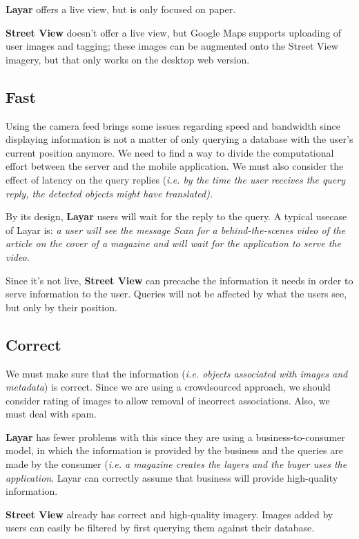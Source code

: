 \documentclass[a4paper,onecolumn,oneside,titlepage,11pt]{article}
\begin{document}
\textbf{Layar} offers a live view, but is only focused on paper.

\textbf{Street View} doesn't offer a live view, but Google Maps supports uploading of user images and tagging; these images can be augmented onto the Street View imagery, but that only works on the desktop web version.
\subsection*{Fast}
Using the camera feed brings some issues regarding speed and bandwidth since displaying information is not a matter of only querying a database with the user's current position anymore. We need to find a way to divide the computational effort between the server and the mobile application. We must also consider the effect of latency on the query replies (\emph{i.e. by the time the user receives the query reply, the detected objects might have translated).}

By its design, \textbf{Layar} users will wait for the reply to the query. A typical usecase of Layar is: \emph{a user will see the message \emph{Scan for a behind-the-scenes video of the article} on the cover of a magazine and will wait for the application to serve the video}.

Since it's not live, \textbf{Street View} can precache the information it needs in order to serve information to the user. Queries will not be affected by what the users see, but only by their position.

\subsection*{Correct}
We must make sure that the information (\emph{i.e. objects associated with images and metadata}) is correct. Since we are using a crowdsourced approach, we should consider rating of images to allow removal of incorrect associations. Also, we must deal with spam.

\textbf{Layar} has fewer problems with this since they are using a business-to-consumer model, in which the information is provided by the business and the queries are made by the consumer (\emph{i.e. a magazine creates the layers and the buyer uses the application}. Layar can correctly assume that business will provide high-quality information.

\textbf{Street View} already has correct and high-quality imagery. Images added by users can easily be filtered by first querying them against their database.
\end{document}
